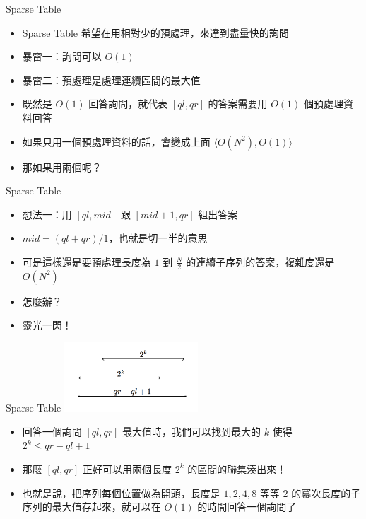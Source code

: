 \documentclass[standalone]{beamer}
\begin{document}
\begin{frame}[fragile]{Sparse Table}
  \begin{itemize}
    \item Sparse Table 希望在用相對少的預處理，來達到盡量快的詢問
    \item 暴雷一：詢問可以 $O(1)$
    \item 暴雷二：預處理是處理連續區間的最大值
    \item 既然是 $O(1)$ 回答詢問，就代表 $[ql, qr]$ 的答案需要用 $O(1)$ 個預處理資料回答
    \item 如果只用一個預處理資料的話，會變成上面 \(\langle {O}(N^2), {O}(1)\rangle\)
    \item 那如果用兩個呢？
  \end{itemize}
\end{frame}

\begin{frame}[fragile]{Sparse Table}
  \begin{itemize}
    \item 想法一：用 $[ql, mid]$ 跟 $[mid + 1, qr]$ 組出答案
    \item $mid = (ql + qr) / 1$，也就是切一半的意思
    \item 可是這樣還是要預處理長度為 $1$ 到 $\frac{N}{2}$ 的連續子序列的答案，複雜度還是 $O(N^2)$
    \item 怎麼辦？
    \item 靈光一閃！
  \end{itemize}
\end{frame}

\begin{frame}{Sparse Table}
  \includegraphics[width=5cm]{figures/sparse-table.png}
  \begin{itemize}
    \item 回答一個詢問 \([ql, qr]\) 最大值時，我們可以找到最大的 \(k\) 使得 \(2^k \leq qr - ql + 1\)
    \item 那麼 \([ql, qr]\) 正好可以用兩個長度 \(2^k\) 的區間的聯集湊出來！
    \item 也就是說，把序列每個位置做為開頭，長度是 $1, 2, 4, 8$ 等等 $2$ 的冪次長度的子序列的最大值存起來，就可以在 $O(1)$ 的時間回答一個詢問了
  \end{itemize}
\end{frame}
\end{document}
